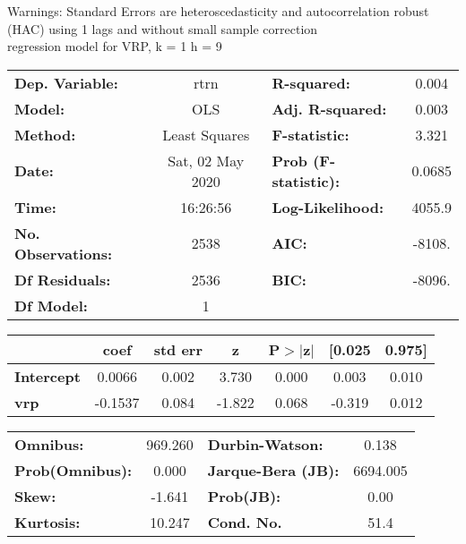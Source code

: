Warnings: \newline
 [1] Standard Errors are heteroscedasticity and autocorrelation robust (HAC) using 1 lags and without small sample correction\\ 

regression model for VRP, k = 1 h = 9\begin{center}
\begin{tabular}{lclc}
\toprule
\textbf{Dep. Variable:}    &       rtrn       & \textbf{  R-squared:         } &     0.004   \\
\textbf{Model:}            &       OLS        & \textbf{  Adj. R-squared:    } &     0.003   \\
\textbf{Method:}           &  Least Squares   & \textbf{  F-statistic:       } &     3.321   \\
\textbf{Date:}             & Sat, 02 May 2020 & \textbf{  Prob (F-statistic):} &   0.0685    \\
\textbf{Time:}             &     16:26:56     & \textbf{  Log-Likelihood:    } &    4055.9   \\
\textbf{No. Observations:} &        2538      & \textbf{  AIC:               } &    -8108.   \\
\textbf{Df Residuals:}     &        2536      & \textbf{  BIC:               } &    -8096.   \\
\textbf{Df Model:}         &           1      & \textbf{                     } &             \\
\bottomrule
\end{tabular}
\begin{tabular}{lcccccc}
                   & \textbf{coef} & \textbf{std err} & \textbf{z} & \textbf{P$> |$z$|$} & \textbf{[0.025} & \textbf{0.975]}  \\
\midrule
\textbf{Intercept} &       0.0066  &        0.002     &     3.730  &         0.000        &        0.003    &        0.010     \\
\textbf{vrp}       &      -0.1537  &        0.084     &    -1.822  &         0.068        &       -0.319    &        0.012     \\
\bottomrule
\end{tabular}
\begin{tabular}{lclc}
\textbf{Omnibus:}       & 969.260 & \textbf{  Durbin-Watson:     } &    0.138  \\
\textbf{Prob(Omnibus):} &   0.000 & \textbf{  Jarque-Bera (JB):  } & 6694.005  \\
\textbf{Skew:}          &  -1.641 & \textbf{  Prob(JB):          } &     0.00  \\
\textbf{Kurtosis:}      &  10.247 & \textbf{  Cond. No.          } &     51.4  \\
\bottomrule
\end{tabular}
\end{center}

